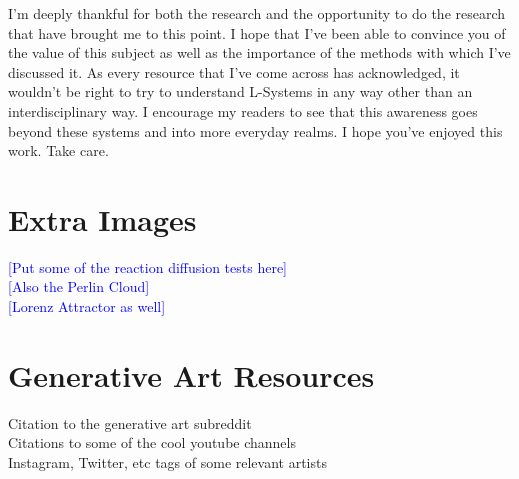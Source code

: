 \documentclass[12pt,twoside]{reedthesis}
\begin{document}
	I'm deeply thankful for both the research and the opportunity to do the research that have brought me to this point. I hope that I've been able to convince you of the value of this subject as well as the importance of the methods with which I've discussed it. As every resource that I've come across has acknowledged, it wouldn't be right to try to understand L-Systems in any way other than an interdisciplinary way. I encourage my readers to see that this awareness goes beyond these systems and into more everyday realms. I hope you've enjoyed this work. Take care.

    \appendix
      \chapter{Extra Images}
      \textcolor{blue}{[Put some of the reaction diffusion tests here]}\\
      \textcolor{blue}{[Also the Perlin Cloud]}\\
      \textcolor{blue}{[Lorenz Attractor as well]}\\
      \chapter{Generative Art Resources}
      \label{Resources}
      Citation to the generative art subreddit\\
      Citations to some of the cool youtube channels\\
      Instagram, Twitter, etc tags of some relevant artists\\

\backmatter 
\nocite{*}


 
\end{document}
